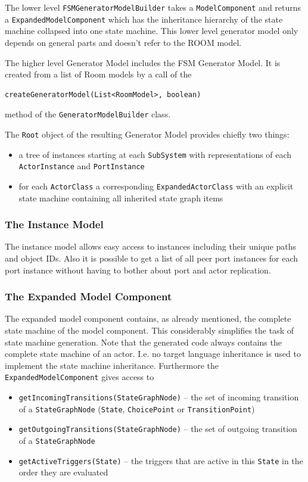 The lower level \texttt{FSMGeneratorModelBuilder} takes a \texttt{ModelComponent} and returns a \texttt{ExpandedModelComponent} which
has the inheritance hierarchy of the state machine collapsed into one state machine.
This lower level generator model only depends on general parts and doesn't refer to the ROOM model.

The higher level Generator Model includes the FSM Generator Model.
It is created from a list of Room models by a call of the

\begin{verbatim}createGeneratorModel(List<RoomModel>, boolean)\end{verbatim}

method of the \texttt{GeneratorModelBuilder} class.

The \texttt{Root} object of the resulting Generator Model provides chiefly two things:
\begin{itemize}
\item a tree of instances starting at each \texttt{SubSystem} with representations of each 
\texttt{ActorInstance} and \texttt{PortInstance}
\item for each \texttt{ActorClass} a corresponding \texttt{ExpandedActorClass} with an explicit state 
machine containing all inherited state graph items
\end{itemize}

\subsubsection{The Instance Model}

The instance model allows easy access to instances including their unique paths and object IDs. Also it is 
possible to get a list of all peer port instances for each port instance without having to bother about 
port and actor replication.

\subsubsection{The Expanded Model Component}

The expanded model component contains, as already mentioned, the complete state machine of the model component. 
This considerably simplifies the task of state machine generation. Note that the generated code always 
contains the complete state machine of an actor. I.e. no target language inheritance is used to implement 
the state machine inheritance.
Furthermore the \texttt{ExpandedModelComponent} gives access to
\begin{itemize}
\item \texttt{getIncomingTransitions(StateGraphNode)} -- the set of incoming transition of a 
\texttt{StateGraphNode} (\texttt{State}, \texttt{ChoicePoint} or \texttt{TransitionPoint})
\item \texttt{getOutgoingTransitions(StateGraphNode)} -- the set of outgoing transition of a 
\texttt{StateGraphNode}
\item \texttt{getActiveTriggers(State)} -- the triggers that are active in this \texttt{State} in the 
order they are evaluated
\end{itemize}


